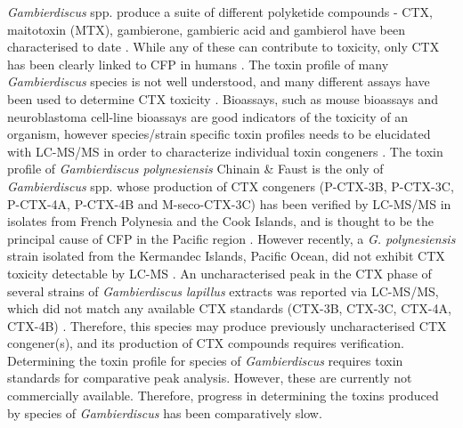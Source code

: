 \documentclass[12pt]{article}
\begin{document}
\emph{Gambierdiscus} spp. produce a suite of different polyketide compounds - CTX, maitotoxin (MTX), gambierone, gambieric acid and gambierol have been characterised to date \citep{satake1993gambierol,nagai1992gambieric,rodriguez2015gambierone,murata1993structure,murata1989structures}. While any of these can contribute to toxicity, only CTX has been clearly linked to CFP in humans \citep{chinain1997intraspecific,holmes1998gambierdiscus}. The toxin profile of many \textit{Gambierdiscus} species is not well understood, and many different assays have been used to determine CTX toxicity \citep{globalcig}. Bioassays, such as mouse bioassays and neuroblastoma cell-line bioassays are good indicators of the toxicity of an organism, however species/strain specific toxin profiles needs to be elucidated with LC-MS/MS in order to characterize individual toxin congeners \citep{diogened2014chemistry}. The toxin profile of \textit{Gambierdiscus polynesiensis} Chinain \& Faust is the only of \emph{Gambierdiscus} spp. whose production of CTX congeners (P-CTX-3B, P-CTX-3C, P-CTX-4A, P-CTX-4B and M-seco-CTX-3C) has been verified by LC-MS/MS in isolates from French Polynesia and the Cook Islands, and is thought to be the principal cause of CFP in the Pacific region \citep{chinain2010growth,rhodes2014production}. However recently, a \emph{G. polynesiensis} strain isolated from the Kermandec Islands, Pacific Ocean, did not exhibit CTX toxicity detectable by LC-MS \cite{rhodes2017epiphytic}.
An uncharacterised peak in the CTX phase of several strains of \emph{Gambierdiscus lapillus} extracts was reported via LC-MS/MS, which did not match any available CTX standards (CTX-3B, CTX-3C, CTX-4A, CTX-4B) \cite{kretzschmar2016characterization}. Therefore, this species may produce previously uncharacterised CTX congener(s), and its production of CTX compounds requires verification.
Determining the toxin profile for species of \textit{Gambierdiscus} requires toxin standards for comparative peak analysis. However, these are currently not commercially available. Therefore, progress in determining the toxins produced by species of \emph{Gambierdiscus} has been comparatively slow.\\

\end{document}
